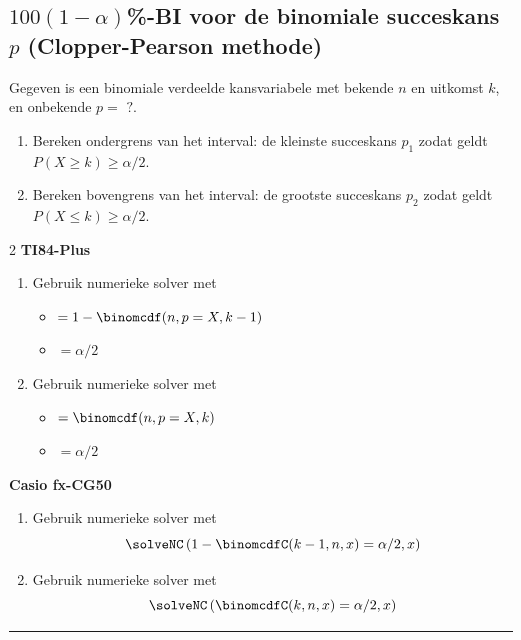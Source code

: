 \subsection*{$100(1-\alpha)$\si{\percent}-BI voor de binomiale succeskans $p$ (Clopper-Pearson methode)}
    Gegeven is een binomiale verdeelde kansvariabele met bekende $n$ en uitkomst $k$, en onbekende $p = \text{ ?}$.
    \begin{enumerate}
        \item Bereken ondergrens van het interval: de kleinste succeskans $p_1$ zodat geldt $P(X \geq k) \geq \alpha/2$.
        \item Bereken bovengrens van het interval: de grootste succeskans $p_2$ zodat geldt $P(X \leq k) \geq \alpha/2$.
    \end{enumerate}
    \begin{multicols}{2}
        \centering\textbf{TI84-Plus}
            \begin{enumerate}
                \item Gebruik numerieke solver met 
                \begin{itemize}
                    \item[$E_1$] $= 1 - \binomcdf(n, p=X, k-1)$
                    \item[$E_2$] $=\alpha/2$
                \end{itemize}
                \item Gebruik numerieke solver met
                \begin{itemize}
                    \item[$E_1$] $= \binomcdf(n, p=X, k)$
                    \item[$E_2$] $=\alpha/2$
                \end{itemize}
            \end{enumerate}

            \columnbreak

            \centering\textbf{Casio fx-CG50}
            \begin{enumerate}
                \item Gebruik numerieke solver met \[\solveNC\left(1-\binomcdfC(k-1,n,x)=\alpha/2, x\right)\]
                \item Gebruik numerieke solver met \[\solveNC\left(\binomcdfC(k,n,x)=\alpha/2, x\right)\]
            \end{enumerate}
    \end{multicols}
\hrule 


